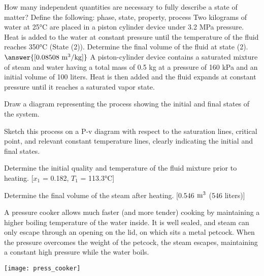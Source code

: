 \begin{homework}
  \question How many independent quantities are necessary to fully describe a state of matter?
  \question Define the following: phase, state, property, process
  \question Two kilograms of water at 25°C are placed in a piston cylinder device under 3.2 MPa pressure. Heat is added to the water at constant pressure until the temperature of the fluid reaches 350°C (State (2)). Determine the final volume of the fluid at state (2). $\answer{[0.08508\ {\rm m^3}/{\rm kg}]}$
  \question A piston-cylinder device contains a saturated mixture of steam and water having a total mass of 0.5 kg at a pressure of 160 kPa and an initial volume of 100 liters. Heat is then added and the fluid expands at constant pressure until it reaches a saturated vapor state.
\begin{questionparts}
\item Draw a diagram representing the process showing the initial and final states of the system.

\item Sketch this process on a P-v diagram with respect to the saturation lines, critical point, and relevant constant temperature lines, clearly indicating the initial and final states.

\item Determine the initial quality and temperature of the fluid mixture prior to heating. {\color{red} [$x_1$ = 0.182, $T_1$ = 113.3°C]}

\item Determine the final volume of the steam after heating. {\color{red} [0.546 $\rm m^3$ (546 liters)]}
\end{questionparts}
\question A pressure cooker allows much faster (and more tender) cooking by maintaining a higher boiling temperature of the water inside. It is well sealed, and steam can only escape through an opening on the lid, on which sits a metal petcock. When the pressure overcomes the weight of the petcock, the steam escapes, maintaining a constant high pressure while the water boils.

\begin{center}
  \texttt{[image: press\_cooker]}
\end{center}
  

\end{homework}
